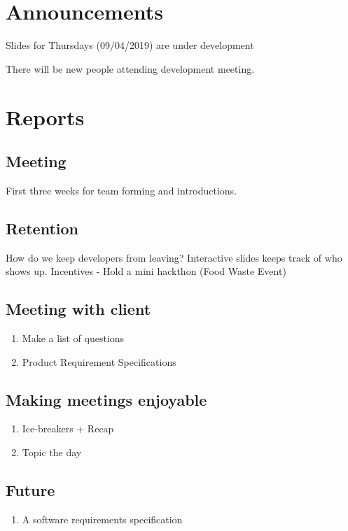 \documentclass[11pt]{meetingmins}
\begin{document}
\maketitle

\section{Announcements}
\begin{hiddenitems}
\item
Slides for Thursdays (09/04/2019) are under development 

\item There will be new people attending development meeting. 

\end{hiddenitems}
\section{Reports}
\subsection{Meeting} First three weeks for team forming and introductions. 
\subsection{Retention} How do we keep developers from leaving? Interactive slides keeps track of who shows up. Incentives - Hold a mini hackthon (Food Waste Event) 
\subsection{Meeting with client}
\begin{enumerate}
    \item Make a list of questions
    \item Product Requirement Specifications 
\end{enumerate}
\subsection{Making meetings enjoyable}
\begin{enumerate}
    \item Ice-breakers + Recap
    \item Topic the day
\end{enumerate}
\subsection{Future} 
\begin{enumerate}
\item A software requirements specification 
\end{enumerate}
\end{document}
